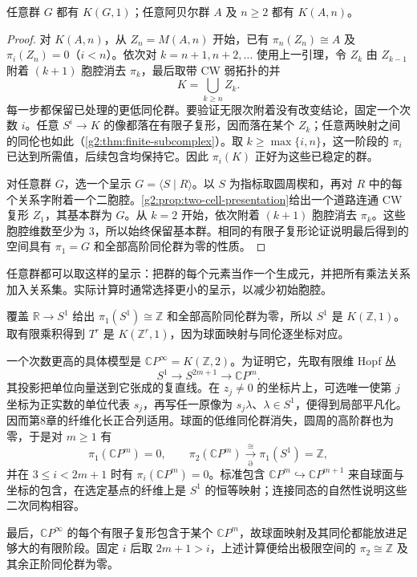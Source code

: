 \begin{theorem}\label{g2:thm:eilenberg-maclane-existence}
	任意群 \(G\) 都有 \(K(G,1)\)；任意阿贝尔群 \(A\) 及 \(n\ge2\) 都有 \(K(A,n)\)。
\end{theorem}
\begin{proof}
	对 \(K(A,n)\)，从 \(Z_n=M(A,n)\) 开始，已有 \(\pi_n(Z_n)\cong A\) 及 \(\pi_i(Z_n)=0\)（\(i<n\)）。依次对 \(k=n+1,n+2,\ldots\) 使用上一引理，令 \(Z_k\) 由 \(Z_{k-1}\) 附着 \((k+1)\) 胞腔消去 \(\pi_k\)，最后取带 CW 弱拓扑的并
	\[
		K=\bigcup_{k\ge n} Z_k.
	\]
	每一步都保留已处理的更低同伦群。要验证无限次附着没有改变结论，固定一个次数 \(i\)。任意 \(S^i\to K\) 的像都落在有限子复形，因而落在某个 \(Z_k\)；任意两映射之间的同伦也如此（\cref{g2:thm:finite-subcomplex}）。取 \(k\ge\max\{i,n\}\)，这一阶段的 \(\pi_i\) 已达到所需值，后续包含均保持它。因此 \(\pi_i(K)\) 正好为这些已稳定的群。

	对任意群 \(G\)，选一个呈示 \(G=\langle S\mid R\rangle\)。以 \(S\) 为指标取圆周楔和，再对 \(R\) 中的每个关系字附着一个二胞腔。\cref{g2:prop:two-cell-presentation}给出一个道路连通 CW 复形 \(Z_1\)，其基本群为 \(G\)。从 \(k=2\) 开始，依次附着 \((k+1)\) 胞腔消去 \(\pi_k\)。这些胞腔维数至少为 \(3\)，所以始终保留基本群。相同的有限子复形论证说明最后得到的空间具有 \(\pi_1=G\) 和全部高阶同伦群为零的性质。
\end{proof}

任意群都可以取这样的呈示：把群的每个元素当作一个生成元，并把所有乘法关系加入关系集。实际计算时通常选择更小的呈示，以减少初始胞腔。

\begin{example}\label{g2:exm:basic-eilenberg-maclane-spaces}
	覆盖 \(\mathbb R\to S^1\) 给出 \(\pi_1(S^1)\cong\mathbb Z\) 和全部高阶同伦群为零，所以 \(S^1\) 是 \(K(\mathbb Z,1)\)。取有限乘积得到 \(T^r\) 是 \(K(\mathbb Z^r,1)\)，因为球面映射与同伦逐坐标对应。

	一个次数更高的具体模型是 \(\mathbb CP^\infty=K(\mathbb Z,2)\)。为证明它，先取有限维 Hopf 丛
	\[
		S^1\longrightarrow S^{2m+1}\longrightarrow\mathbb CP^m.
	\]
	其投影把单位向量送到它张成的复直线。在 \(z_j\ne0\) 的坐标片上，可选唯一使第 \(j\) 坐标为正实数的单位代表 \(s_j\)，再写任一原像为 \(s_j\lambda\)、\(\lambda\in S^1\)，便得到局部平凡化。因而第8章的纤维化长正合列适用。球面的低维同伦群消失，圆周的高阶群也为零，于是对 \(m\ge1\) 有
	\[
		\pi_1(\mathbb CP^m)=0,\qquad
		\pi_2(\mathbb CP^m)\xrightarrow[\partial]{\ \cong\ }\pi_1(S^1)=\mathbb Z,
	\]
	并在 \(3\le i<2m+1\) 时有 \(\pi_i(\mathbb CP^m)=0\)。标准包含 \(\mathbb CP^m\hookrightarrow\mathbb CP^{m+1}\) 来自球面与坐标的包含，在选定基点的纤维上是 \(S^1\) 的恒等映射；连接同态的自然性说明这些二次同构相容。

	最后，\(\mathbb CP^\infty\) 的每个有限子复形包含于某个 \(\mathbb CP^m\)，故球面映射及其同伦都能放进足够大的有限阶段。固定 \(i\) 后取 \(2m+1>i\)，上述计算便给出极限空间的 \(\pi_2\cong\mathbb Z\) 及其余正阶同伦群为零。
\end{example}

